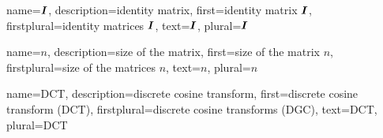 {%
  name={$\boldsymbol{I}$},%
  description={identity matrix},%
  first={identity matrix $\boldsymbol{I}$},%
  firstplural={identity matrices $\boldsymbol{I}$},%
  text={$\boldsymbol{I}$},%
  plural={$\boldsymbol{I}$}%
}

{%
  name={$n$},%
  description={size of the matrix},%
  first={size of the matrix $n$},%
  firstplural={size of the matrices $n$},%
  text={$n$},%
  plural={$n$}%
}

{%
  name={DCT},%
  description={discrete cosine transform},%
  first={discrete cosine transform (DCT)},%
  firstplural={discrete cosine transforms (DGC)},%
  text={DCT},%
  plural={DCT}%
}